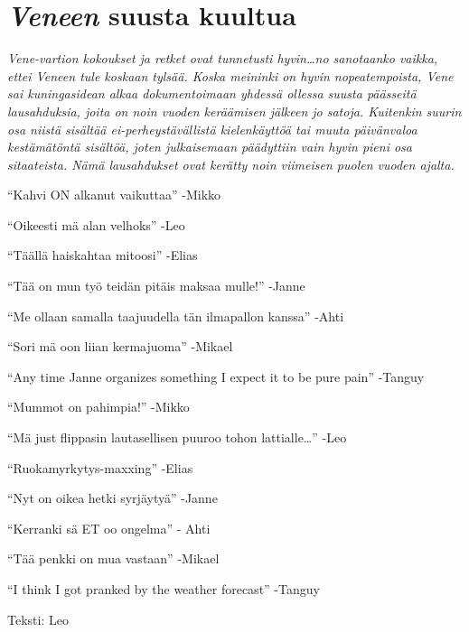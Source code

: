 
\section{\textit{Veneen} suusta kuultua}

\textit{Vene-vartion kokoukset ja retket ovat tunnetusti hyvin…no sanotaanko vaikka,
ettei Veneen tule koskaan tylsää. Koska meininki on hyvin nopeatempoista, Vene
sai kuningasidean alkaa dokumentoimaan yhdessä ollessa suusta päässeitä
lausahduksia, joita on noin vuoden keräämisen jälkeen jo satoja. Kuitenkin
suurin osa niistä sisältää ei-perheystävällistä kielenkäyttöä tai muuta
päivänvaloa kestämätöntä sisältöä, joten julkaisemaan päädyttiin vain hyvin
pieni osa sitaateista. Nämä lausahdukset ovat kerätty noin viimeisen puolen
vuoden ajalta.}

{\setlength{\parskip}{1em}\setlength{\parindent}{0pt}

“Kahvi ON alkanut vaikuttaa” -Mikko

“Oikeesti mä alan velhoks” -Leo

“Täällä haiskahtaa mitoosi” -Elias

“Tää on mun työ teidän pitäis maksaa mulle!” -Janne

“Me ollaan samalla taajuudella tän ilmapallon kanssa” -Ahti

“Sori mä oon liian kermajuoma” -Mikael

“Any time Janne organizes something I expect it to be pure pain” -Tanguy

“Mummot on pahimpia!” -Mikko

“Mä just flippasin lautasellisen puuroo tohon lattialle…” -Leo

“Ruokamyrkytys-maxxing” -Elias

“Nyt on oikea hetki syrjäytyä” -Janne

“Kerranki sä ET oo ongelma” - Ahti

“Tää penkki on mua vastaan” -Mikael

“I think I got pranked by the weather forecast” -Tanguy}

\vfill

\noindent\null\hfill Teksti: Leo
